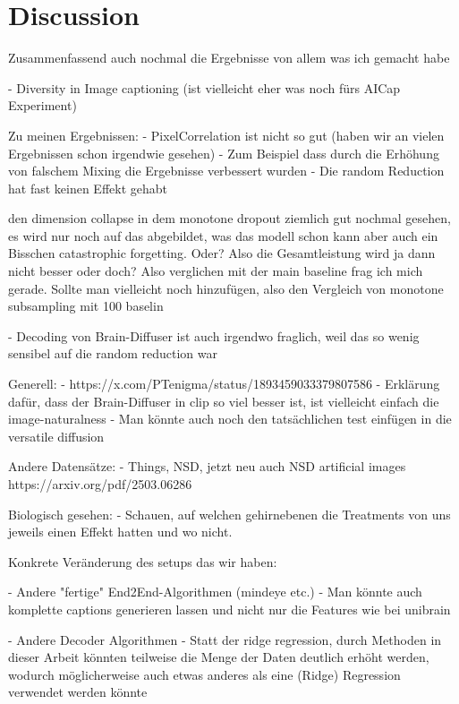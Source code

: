 \chapter{Discussion}

Zusammenfassend auch nochmal die Ergebnisse von allem was ich gemacht habe

\cite{wangDiversityImageCaptioning2022}
- Diversity in Image captioning (ist vielleicht eher was noch fürs AICap Experiment)

Zu meinen Ergebnissen:
- PixelCorrelation ist nicht so gut (haben wir an vielen Ergebnissen schon irgendwie gesehen)
    - Zum Beispiel dass durch die Erhöhung von falschem Mixing die Ergebnisse verbessert wurden
    - Die random Reduction hat fast keinen Effekt gehabt


den dimension collapse in dem monotone dropout ziemlich gut nochmal gesehen, es wird nur noch auf das abgebildet, was das modell schon kann
aber auch ein Bisschen catastrophic forgetting. 
Oder?
Also die Gesamtleistung wird ja dann nicht besser oder doch?
Also verglichen mit der main baseline frag ich mich gerade.
Sollte man vielleicht noch hinzufügen, also den Vergleich von monotone subsampling mit 100 baselin

- Decoding von Brain-Diffuser ist auch irgendwo fraglich, weil das so wenig sensibel auf die random reduction war

Generell:
- https://x.com/PTenigma/status/1893459033379807586
- Erklärung dafür, dass der Brain-Diffuser in clip so viel besser ist, ist vielleicht einfach die image-naturalness
- Man könnte auch noch den tatsächlichen test einfügen in die versatile diffusion

Andere Datensätze:
- Things, NSD, jetzt neu auch NSD artificial images https://arxiv.org/pdf/2503.06286

Biologisch gesehen:
- Schauen, auf welchen gehirnebenen die Treatments von uns jeweils einen Effekt hatten und wo nicht.

Konkrete Veränderung des setups das wir haben:

- Andere "fertige" End2End-Algorithmen (mindeye etc.)
    - Man könnte auch komplette captions generieren lassen und nicht nur die Features wie bei unibrain \cite{maiUniBrainUnifyImage2023}

- Andere Decoder Algorithmen 
    - Statt der ridge regression, durch Methoden in dieser Arbeit könnten teilweise die Menge der Daten deutlich erhöht werden, wodurch möglicherweise auch etwas anderes als eine (Ridge) Regression verwendet werden könnte

